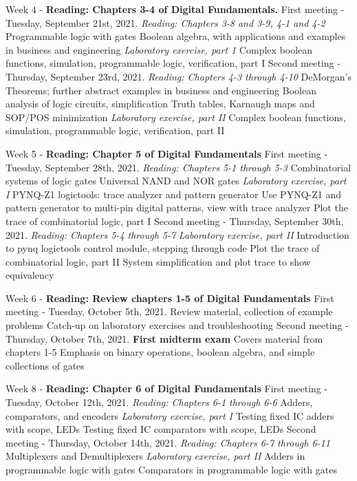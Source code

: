 \documentclass[10pt]{article}
\begin{document}
\begin{outline}[enumerate]
\1 Week 4 - \textbf{Reading: Chapters 3-4 of Digital Fundamentals.}
\2 First meeting - Tuesday, September 21st, 2021. \textit{Reading: Chapters 3-8 and 3-9, 4-1 and 4-2}
\3 Programmable logic with gates
\3 Boolean algebra, with applications and examples in business and engineering
\3 \textit{Laboratory exercise, part 1}
\4 Complex boolean functions, simulation, programmable logic, verification, part I
\2 Second meeting - Thursday, September 23rd, 2021.  \textit{Reading: Chapters 4-3 through 4-10}
\3 DeMorgan's Theorems; further abstract examples in business and engineering
\3 Boolean analysis of logic circuits, simplification
\3 Truth tables, Karnaugh maps and SOP/POS minimization
\3 \textit{Laboratory exercise, part II}
\4 Complex boolean functions, simulation, programmable logic, verification, part II

\1 Week 5 - \textbf{Reading: Chapter 5 of Digital Fundamentals}
\2 First meeting - Tuesday, September 28th, 2021. \textit{Reading:  Chapters 5-1 through 5-3}
\3 Combinatorial systems of logic gates
\3 Universal NAND and NOR gates
\3 \textit{Laboratory exercise, part I}
\4 PYNQ-Z1 logictools: trace analyzer and pattern generator
\4 Use PYNQ-Z1 and pattern generator to multi-pin digital patterns, view with trace analyzer
\4 Plot the trace of combinatorial logic, part I
\2 Second meeting - Thursday, September 30th, 2021. \textit{Reading: Chapters 5-4 through 5-7}
\3 \textit{Laboratory exercise, part II}
\4 Introduction to pynq logictools control module, stepping through code
\4 Plot the trace of combinatorial logic, part II
\4 System simplification and plot trace to show equivalency

\1 Week 6 - \textbf{Reading: Review chapters 1-5 of Digital Fundamentals}
\2 First meeting - Tuesday, October 5th, 2021.
\3 Review material, collection of example problems
\3 Catch-up on laboratory exercises and troubleshooting
\2 Second meeting - Thursday, October 7th, 2021.
\3 \textbf{First midterm exam}
\4 Covers material from chapters 1-5
\4 Emphasis on binary operations, boolean algebra, and simple collections of gates

\1 Week 8 - \textbf{Reading: Chapter 6 of Digital Fundamentals}
\2 First meeting - Tuesday, October 12th, 2021. \textit{Reading: Chapters 6-1 through 6-6}
\3 Adders, comparators, and encoders
\3 \textit{Laboratory exercise, part I}
\4 Testing fixed IC adders with scope, LEDs
\4 Testing fixed IC comparators with scope, LEDs
\2 Second meeting - Thursday, October 14th, 2021. \textit{Reading: Chapters 6-7 through 6-11}
\3 Multiplexers and Demultiplexers
\3 \textit{Laboratory exercise, part II}
\4 Adders in programmable logic with gates
\4 Comparators in programmable logic with gates


\end{outline}
\end{document}
